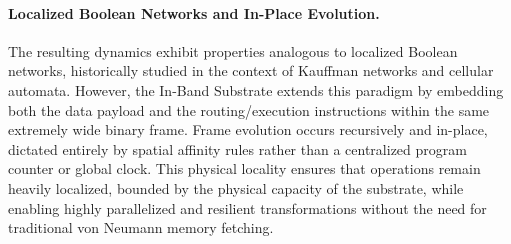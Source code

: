 \paragraph{Localized Boolean Networks and In-Place Evolution.}
The resulting dynamics exhibit properties analogous to localized Boolean networks, historically studied in the context of Kauffman networks \citep{kauffman1969metabolic} and cellular automata. However, the In-Band Substrate extends this paradigm by embedding both the data payload and the routing/execution instructions within the same extremely wide binary frame. Frame evolution occurs recursively and in-place, dictated entirely by spatial affinity rules rather than a centralized program counter or global clock. This physical locality ensures that operations remain heavily localized, bounded by the physical capacity of the substrate, while enabling highly parallelized and resilient transformations without the need for traditional von Neumann memory fetching.
